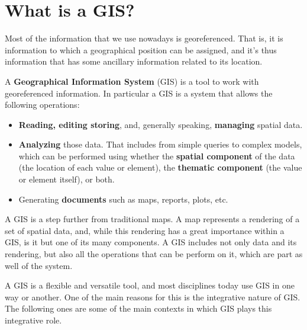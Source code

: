 
\chapter{What is a GIS?}

\pagestyle{fancy}

Most of the information that we use nowadays is georeferenced. That is, it is information to which a geographical position can be assigned, and it's thus information that has some ancillary information related to its location.


A \textbf{Geographical Information System} (GIS) is a tool to work with georeferenced information. In particular a GIS is a system that allows the following operations:

\begin{itemize}
	\item \textbf{Reading, editing storing}, and, generally speaking, \textbf{managing} spatial data.
	\item \textbf{Analyzing} those data. That includes from simple queries to complex models, which can be performed using whether the \textbf{spatial component} of the data (the location of each value or element), the \textbf{thematic component} (the value or element itself), or both.
	\item Generating \textbf{documents} such as maps, reports, plots, etc.
\end{itemize}


A GIS is a step further from traditional maps. A map represents a rendering of a set of spatial data, and, while this rendering has a great importance within a GIS, is it but one of its many components. A GIS includes not only data and its rendering, but also all the operations that can be perform on it, which are part as well of the system.

A GIS is a flexible and versatile tool, and most disciplines today use GIS in one way or another. One of the main reasons for this is the integrative nature of GIS. The following ones are some of the main contexts in which GIS plays this integrative role.



